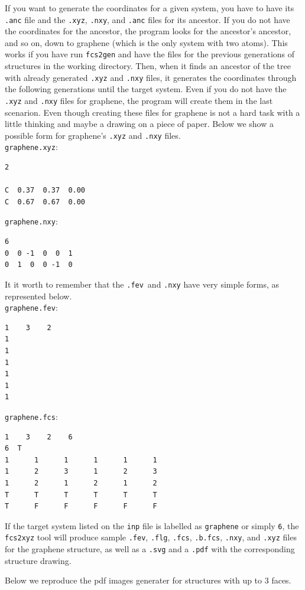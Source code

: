 \documentclass{scrreprt}
\newcommand{\fev}{\texttt{.fev}}
\newcommand{\fcs}{\texttt{.fcs}}
\newcommand{\flg}{\texttt{.flg}}
\newcommand{\fcsb}{\texttt{.b.fcs}}
\begin{document}
If you want to generate the coordinates for a given system, you have to have its \verb-.anc- file and the \verb-.xyz-, \verb-.nxy-, and \verb-.anc- files for its ancestor. If you do not have the coordinates for the ancestor, the program looks for the ancestor's ancestor, and so on, down to graphene (which is the only system with two atoms). This works if you have run \verb-fcs2gen- and have the files for the previous generations of structures in the working directory. Then, when it finds an ancestor of the tree with already generated \verb-.xyz- and \verb-.nxy- files, it generates the coordinates through the following generations until the target system. Even if you do not have the \verb-.xyz- and \verb-.nxy- files for graphene, the program will create them in the last scenarion. Even though creating these files for graphene is not a hard task with a little thinking and maybe a drawing on a piece of paper. Below we show a possible form for graphene's \verb-.xyz- and \verb-.nxy- files.\\
\verb-graphene.xyz-:
\begin{verbatim}
2

C  0.37  0.37  0.00
C  0.67  0.67  0.00
\end{verbatim}
\verb-graphene.nxy-:
\begin{verbatim}
6
0  0 -1  0  0  1
0  1  0  0 -1  0
\end{verbatim}

It it worth to remember that the \fev~and \verb-.nxy- have very simple forms, as represented below.\\
\verb-graphene.fev-:
\begin{verbatim}
1    3    2
1
1
1
1
1
1
\end{verbatim}
\verb-graphene.fcs-:
\begin{verbatim}
1    3    2    6
6  T
1      1      1      1      1      1
1      2      3      1      2      3
1      2      1      2      1      2
T      T      T      T      T      T
T      F      F      F      F      F
\end{verbatim}

If the target system listed on the \verb-inp- file is labelled as \verb-graphene- or simply \verb-6-, the \verb-fcs2xyz- tool will produce sample \fev, \flg, \fcs, \fcsb, \verb-.nxy-, and \verb-.xyz- files for the graphene structure, as well as a \verb-.svg- and a \verb-.pdf- with the corresponding structure drawing.

Below we reproduce the pdf images generater for structures with up to 3 faces.
\end{document}
